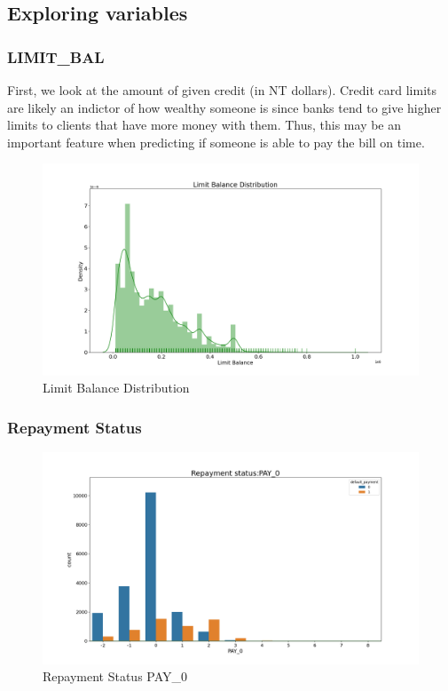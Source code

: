 \documentclass[
]{article}
\begin{document}
\hypertarget{exploring-variables}{%
\subsection{Exploring variables}\label{exploring-variables}}

\hypertarget{limit_bal}{%
\subsubsection{LIMIT\_BAL}\label{limit_bal}}

First, we look at the amount of given credit (in NT dollars). Credit
card limits are likely an indictor of how wealthy someone is since banks
tend to give higher limits to clients that have more money with them.
Thus, this may be an important feature when predicting if someone is
able to pay the bill on time.

\begin{figure}
\includegraphics[width=0.8\linewidth]{../results/limit_bal_dist} \caption{Limit Balance Distribution}\label{fig:limit-dist}
\end{figure}

\hypertarget{repayment-status}{%
\subsubsection{Repayment Status}\label{repayment-status}}

\begin{figure}

{\centering \includegraphics[width=0.8\linewidth]{../results/repayment_status_PAY_0} 

}

\caption{Repayment Status PAY_0}\label{fig:repayment-status-PAY-0}
\end{figure}
\end{document}
